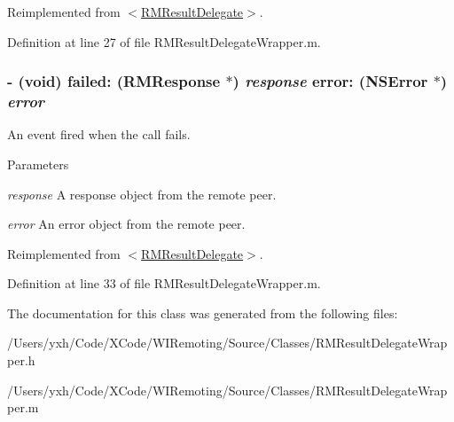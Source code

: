 Reimplemented from \hyperlink{protocol_r_m_result_delegate-p_a965fe7cc4e150bb6ecf7cbb02b9c7248}{$<$RMResultDelegate$>$}.

Definition at line 27 of file RMResultDelegateWrapper.m.\hypertarget{interface_r_m_result_delegate_wrapper_ad4fccdd6b67ba89b4abe76f64708b82c}{
\subsubsection[{failed:error:}]{\setlength{\rightskip}{0pt plus 5cm}-\/ (void) failed: ({\bf RMResponse} $\ast$) {\em response}\/ error: (NSError $\ast$) {\em error}}}
\label{interface_r_m_result_delegate_wrapper_ad4fccdd6b67ba89b4abe76f64708b82c}


An event fired when the call fails. 
\begin{DoxyParams}{Parameters}
\item[{\em response}]A response object from the remote peer. \item[{\em error}]An error object from the remote peer. \end{DoxyParams}


Reimplemented from \hyperlink{protocol_r_m_result_delegate-p_a3521cd9555449b32aabdb759d2dadce5}{$<$RMResultDelegate$>$}.

Definition at line 33 of file RMResultDelegateWrapper.m.

The documentation for this class was generated from the following files:\begin{DoxyCompactItemize}
\item 
/Users/yxh/Code/XCode/WIRemoting/Source/Classes/RMResultDelegateWrapper.h\item 
/Users/yxh/Code/XCode/WIRemoting/Source/Classes/RMResultDelegateWrapper.m\end{DoxyCompactItemize}

